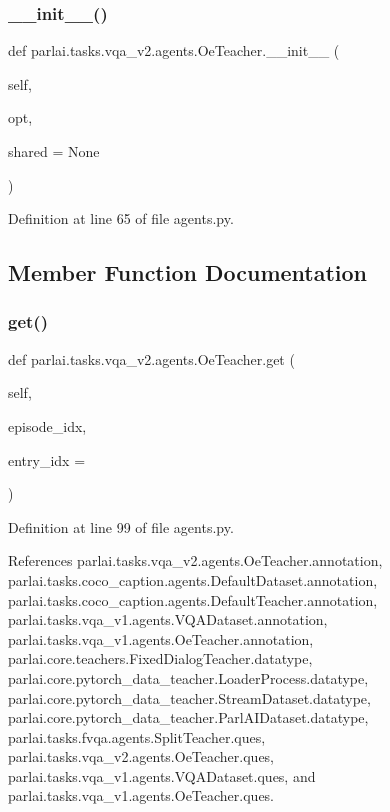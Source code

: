 \subsubsection{\texorpdfstring{\+\_\+\+\_\+init\+\_\+\+\_\+()}{\_\_init\_\_()}}
{\footnotesize\ttfamily def parlai.\+tasks.\+vqa\+\_\+v2.\+agents.\+Oe\+Teacher.\+\_\+\+\_\+init\+\_\+\+\_\+ (\begin{DoxyParamCaption}\item[{}]{self,  }\item[{}]{opt,  }\item[{}]{shared = {\ttfamily None} }\end{DoxyParamCaption})}



Definition at line 65 of file agents.\+py.



\subsection{Member Function Documentation}
\mbox{\label{classparlai_1_1tasks_1_1vqa__v2_1_1agents_1_1OeTeacher_a75d45765b191394b0defbbe3b8bb09e0}} 
\subsubsection{\texorpdfstring{get()}{get()}}
{\footnotesize\ttfamily def parlai.\+tasks.\+vqa\+\_\+v2.\+agents.\+Oe\+Teacher.\+get (\begin{DoxyParamCaption}\item[{}]{self,  }\item[{}]{episode\+\_\+idx,  }\item[{}]{entry\+\_\+idx = {} }\end{DoxyParamCaption})}



Definition at line 99 of file agents.\+py.



References parlai.\+tasks.\+vqa\+\_\+v2.\+agents.\+Oe\+Teacher.\+annotation, parlai.\+tasks.\+coco\+\_\+caption.\+agents.\+Default\+Dataset.\+annotation, parlai.\+tasks.\+coco\+\_\+caption.\+agents.\+Default\+Teacher.\+annotation, parlai.\+tasks.\+vqa\+\_\+v1.\+agents.\+V\+Q\+A\+Dataset.\+annotation, parlai.\+tasks.\+vqa\+\_\+v1.\+agents.\+Oe\+Teacher.\+annotation, parlai.\+core.\+teachers.\+Fixed\+Dialog\+Teacher.\+datatype, parlai.\+core.\+pytorch\+\_\+data\+\_\+teacher.\+Loader\+Process.\+datatype, parlai.\+core.\+pytorch\+\_\+data\+\_\+teacher.\+Stream\+Dataset.\+datatype, parlai.\+core.\+pytorch\+\_\+data\+\_\+teacher.\+Parl\+A\+I\+Dataset.\+datatype, parlai.\+tasks.\+fvqa.\+agents.\+Split\+Teacher.\+ques, parlai.\+tasks.\+vqa\+\_\+v2.\+agents.\+Oe\+Teacher.\+ques, parlai.\+tasks.\+vqa\+\_\+v1.\+agents.\+V\+Q\+A\+Dataset.\+ques, and parlai.\+tasks.\+vqa\+\_\+v1.\+agents.\+Oe\+Teacher.\+ques.



